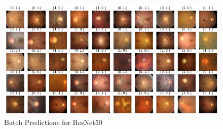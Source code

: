 \vspace{5mm}
\begin{figure}[hbt!]
\centering
\includegraphics[scale=0.6]{images/fig-58.png}
\caption{ Batch Predictions for ResNet50}
\label{fig:x  Batch Predictions for ResNet50}
\end{figure}



